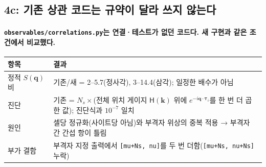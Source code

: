 \subsection{4c: 기존 상관 코드는 규약이 달라 쓰지 않는다}\label{stage4c-legacy}
\begingroup%
  \framesubtitle{\texttt{observables/correlations.py}는 연결·테스트가 없던 코드다. 새 구현과 같은 조건에서 비교했다.}
  \small
  \begin{tabularx}{\textwidth}{@{}P{3.2cm}Y@{}}
    \toprule
    항목 & 결과 \\
    \midrule
    정적 $S(\mathbf q)$ 비 & 기존/새 = 2--5.7(정사각), 3--14.4(삼각); 일정한 배수가 아님 \\
    진단 & 기존 = $N_s\times$(전체 위치 게이지 $\mathsf H(\mathbf k)$ 위에 $e^{-i\mathbf q\cdot\symbf{\tau}_i}$를 한 번 더 곱한 값); 진단식과 $10^{-7}$ 일치 \\
    원인 & 셀당 정규화(사이트당 아님)와 부격자 위상의 중복 적용 → 부격자 간 간섭 항이 틀림 \\
    부가 결함 & 부격자 지정 출력에서 \texttt{[mu+Ns, nu]}를 두 번 더함(\texttt{[mu+Ns, nu+Ns]} 누락) \\
    \bottomrule
  \end{tabularx}
  \par\medskip
\endgroup


